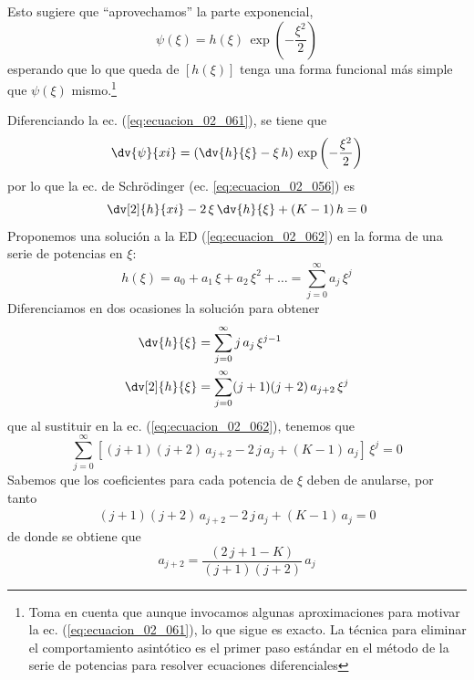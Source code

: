 Esto sugiere que \enquote{aprovechamos} la parte exponencial,
\begin{equation}
\psi (\xi) = h (\xi) \, \exp \left( - \dfrac{\xi^{2}}{2} \right)
\label{eq:ecuacion_02_061}
\end{equation}
esperando que lo que queda de $[h (\xi)]$ tenga una forma funcional más simple que $\psi (\xi)$ mismo.\footnote{Toma en cuenta que aunque invocamos algunas aproximaciones para motivar la ec. (\ref{eq:ecuacion_02_061}), lo que sigue es exacto. La técnica para eliminar el comportamiento asintótico es el primer paso estándar en el método de la serie de potencias para resolver ecuaciones diferenciales}
\par
Diferenciando la ec. (\ref{eq:ecuacion_02_061}), se tiene que
\begin{align*}
\dv{\psi}{xi} = \left( \dv{h}{\xi} - \xi \, h \right) \, \exp \left( - \dfrac{\xi^{2}}{2} \right)
\end{align*}
por lo que la ec. de Schrödinger (ec. \ref{eq:ecuacion_02_056}) es
\begin{equation}
\dv[2]{h}{xi} - 2 \, \xi \, \dv{h}{\xi} +  (K - 1) \, h = 0
\label{eq:ecuacion_02_062}
\end{equation}
Proponemos una solución a la ED (\ref{eq:ecuacion_02_062}) en la forma de una serie de potencias en $\xi$:
\begin{equation}
h (\xi) = a_{0} + a_{1} \, \xi + a_{2} \, \xi^{2} + \ldots = \sum_{j=0}^{\infty} a_{j} \, \xi^{j}
\label{eq:ecuacion_02_063}
\end{equation}
Diferenciamos en dos ocasiones la solución para obtener
\begin{align*}
\dv{h}{\xi} &= \sum_{j=0}^{\infty} j \, a_{j} \, \xi^{j-1} \\
\dv[2]{h}{\xi} &= \sum_{j=0}^{\infty} (j + 1)(j + 2) \, a_{j+2} \, \xi^{j}
\end{align*}
que al sustituir en la ec. (\ref{eq:ecuacion_02_062}), tenemos que
\begin{equation}
\sum_{j=0}^{\infty} [ (j + 1)(j + 2) \, a_{j+2} - 2 \, j \, a_{j} +  (K - 1) \, a_{j} ] \, \xi^{j} = 0
\label{eq:ecuacion_02_64}
\end{equation}
Sabemos que los coeficientes para cada potencia de $\xi$ deben de anularse, por tanto
\begin{align*}
(j + 1)(j + 2) \, a_{j+2} - 2 \, j \, a_{j} +  (K - 1) \, a_{j} = 0
\end{align*}
de donde se obtiene que
\begin{equation}
a_{j+2} = \dfrac{(2 \, j + 1 - K)}{(j + 1)(j + 2)} \, a_{j}
\label{eq:ecuacion_02_065}
\end{equation}
